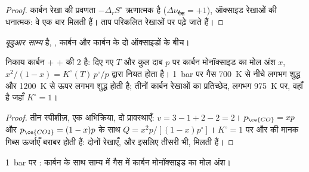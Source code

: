 \begin{proof}
कार्बन रेखा की प्रवणता $-\Delta_r S^\circ$ ऋणात्मक है ($\Delta\nu_{\text{गैस}}
= +1$), ऑक्साइड रेखाओं की धनात्मक: वे एक बार मिलती हैं। ताप
परिकलित रेखाओं पर पढ़े जाते हैं।
\end{proof}

\begin{definition}[बूदुआर साम्य]\label{def:b2:ellingham:boudouard}
\emph{बूदुआर साम्य}  है,
, कार्बन और कार्बन के दो ऑक्साइडों के बीच।
\end{definition}

\begin{proposition}\label{prop:b2:ellingham:boudouard}
निकाय कार्बन +  +  की  2 है: दिए गए $T$ और कुल
दाब $p$ पर कार्बन मोनॉक्साइड का मोल अंश $x$, $x^2/(1 - x)
= K^\circ(T)\,p^\circ/p$ द्वारा नियत होता है। \qty{1}{bar} पर गैस \qty{700}{K} से नीचे लगभग शुद्ध 
और \qty{1200}{K} से ऊपर लगभग शुद्ध  होती है; तीनों कार्बन
रेखाओं का प्रतिच्छेद, लगभग \qty{975}{K} पर, वहाँ है जहाँ $K^\circ = 1$।
\end{proposition}

\begin{proof}
तीन स्पीशीज़, एक अभिक्रिया, दो प्रावस्थाएँ: $v = 3 - 1 + 2 - 2 = 2$। $p_{\ce{CO}}
= xp$ और $p_{\ce{CO2}} = (1 - x)p$ के साथ $Q = x^2p/[(1 - x)p^\circ]$। $K^\circ = 1$ पर
 और  की मानक गिब्स ऊर्जाएँ
बराबर होती हैं: दोनों रेखाएँ, और इसलिए तीसरी भी, मिलती हैं।
\end{proof}

\begin{omfigure}

{\small \qty{1}{bar} पर : कार्बन के साथ साम्य में गैस में कार्बन
मोनॉक्साइड का मोल अंश।}
\end{omfigure}

